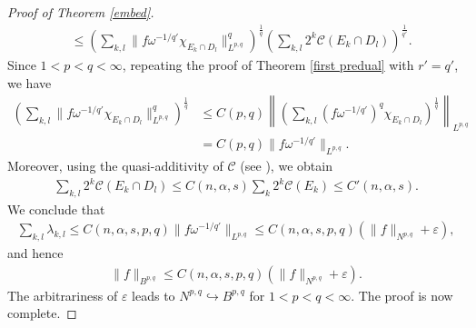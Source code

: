 \documentclass[10pt,reqno]{amsart}
\numberwithin{equation}{section}
\begin{document}
\begin{proof}[Proof of Theorem \ref{embed}]
\begin{align*}
&\leq\left(\sum_{k,l}\|f\omega^{-1/q'}\chi_{E_{k}\cap D_{l}}\|_{L^{p,q}}^{q}\right)^{\frac{1}{q}}\left(\sum_{k,l}2^{k}\mathcal{C}(E_{k}\cap D_{l})\right)^{\frac{1}{q'}}.
\end{align*}
Since $1<p<q<\infty$, repeating the proof of Theorem \ref{first predual} with $r'=q'$, we have
\begin{align*}
\left(\sum_{k,l}\|f\omega^{-1/q'}\chi_{E_{k}\cap D_{l}}\|_{L^{p,q}}^{q}\right)^{\frac{1}{q}}&\leq C(p,q)\left\|\left(\sum_{k,l}(f\omega^{-1/q'})^{q}\chi_{E_{k}\cap D_{l}}\right)^{\frac{1}{q}}\right\|_{L^{p,q}}\\
&=C(p,q)\|f\omega^{-1/q'}\|_{L^{p,q}}.
\end{align*}
Moreover, using the quasi-additivity of $\mathcal{C}$ (see \cite[Theorem 4]{AD}), we obtain
\begin{align*}
\sum_{k,l}2^{k}\mathcal{C}(E_{k}\cap D_{l})\leq C(n,\alpha,s)\sum_{k}2^{k}\mathcal{C}(E_{k})\leq C'(n,\alpha,s).
\end{align*}
We conclude that 
\begin{align*}
\sum_{k,l}\lambda_{k,l}\leq C(n,\alpha,s,p,q)\|f\omega^{-1/q'}\|_{L^{p,q}}\leq C(n,\alpha,s,p,q)(\|f\|_{N^{p,q}}+\varepsilon),
\end{align*}
and hence 
\begin{align*}
\|f\|_{B^{p,q}}\leq C(n,\alpha,s,p,q)(\|f\|_{N^{p,q}}+\varepsilon).
\end{align*}
The arbitrariness of $\varepsilon$ leads to $N^{p,q}\hookrightarrow B^{p,q}$ for $1<p<q<\infty$. The proof is now complete.
\end{proof}
\end{document}
